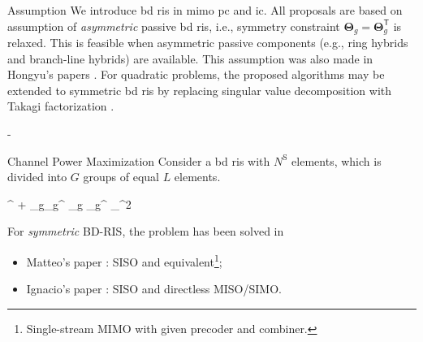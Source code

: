 \documentclass[journal]{IEEEtran}
\begin{document}
\begin{section}{Assumption}
	We introduce \gls{bd} \gls{ris} in \gls{mimo} \gls{pc} and \gls{ic}.
	All proposals are based on assumption of \emph{asymmetric} passive \gls{bd} \gls{ris}, i.e., symmetry constraint $\mathbf{\Theta}_g = \mathbf{\Theta}_g^\mathsf{T}$ is relaxed.
	This is feasible when asymmetric passive components (e.g., ring hybrids and branch-line hybrids) \cite{Ahn2006} are available.
	This assumption was also made in Hongyu's papers \cite{Li2023b,Li2023c}.
	For quadratic problems, the proposed algorithms may be extended to symmetric \gls{bd} \gls{ris} by replacing singular value decomposition with Takagi factorization \cite{Horn2012}.
\end{section}

\begin{section}{-}
	\begin{subsection}{Channel Power Maximization}
		Consider a \gls{bd} \gls{ris} with $N^\mathrm{S}$ elements, which is divided into $G$ groups of equal $L$ elements.
		\begin{maxi!}
			{\scriptstyle{\mathbf{\Theta}}}{\left\lVert {}^ + \sum_g\nolimits {}_g^ \mathbf{\Theta}_g _g^ \right\rVert _^2}{\label{op:pc_power}}{}
		\end{maxi!}
		For \emph{symmetric} BD-RIS, the problem has been solved in
		\begin{itemize}
			\item Matteo's paper \cite{Nerini2023}: SISO and equivalent\footnote{Single-stream MIMO with given precoder and combiner.};
			\item Ignacio's paper \cite{Santamaria2023}: SISO and directless MISO/SIMO.
		\end{itemize}


\end{subsection}
\end{section}
\end{document}
